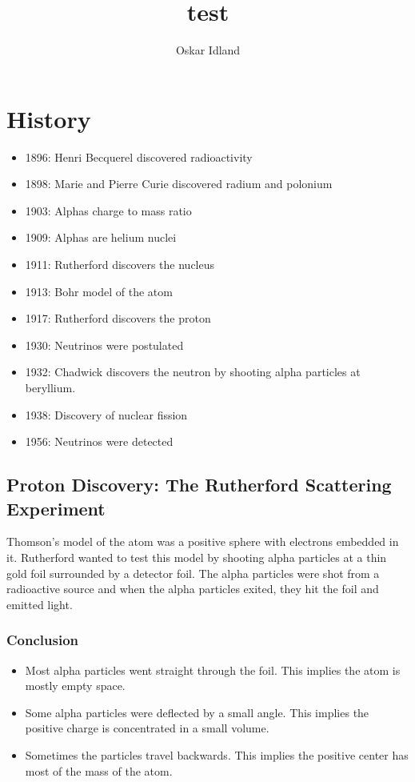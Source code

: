 \documentclass{article}
\author{Oskar Idland}
\title{test}
\date{}
\begin{document}
\maketitle
\tableofcontents
\newpage

\section{History}
\begin{itemize}
    \item 1896: Henri Becquerel discovered radioactivity
    \item 1898: Marie and Pierre Curie discovered radium and polonium
    \item 1903: Alphas charge to mass ratio
    \item 1909: Alphas are helium nuclei
    \item 1911: Rutherford discovers the nucleus
    \item 1913: Bohr model of the atom
    \item 1917: Rutherford discovers the proton
    \item 1930: Neutrinos were postulated 
    \item 1932: Chadwick discovers the neutron by shooting alpha particles at beryllium. 
    \item 1938: Discovery of nuclear fission
    \item 1956: Neutrinos were detected 
\end{itemize}

\subsection{Proton Discovery: The Rutherford Scattering Experiment}

Thomson's model of the atom was a positive sphere with electrons embedded in it. Rutherford wanted to test this model by shooting alpha particles at a thin gold foil surrounded by a detector foil. The alpha particles were shot from a radioactive source and when the alpha particles exited, they hit the foil and emitted light. 
\subsubsection{Conclusion}
\begin{itemize}
    \item Most alpha particles went straight through the foil. This implies the atom is mostly empty space.
    \item Some alpha particles were deflected by a small angle. This implies the positive charge is concentrated in a small volume.
    \item Sometimes the particles travel backwards. This implies the positive center has most of the mass of the atom.
\end{itemize}
\end{document}

